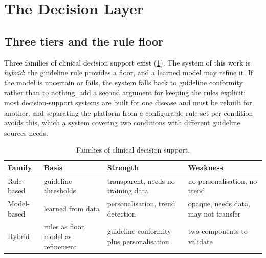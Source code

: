 \documentclass[11pt,a4paper,oneside]{report}
\begin{document}
\section{The Decision Layer}\label{sec:tiers}\label{sec:rule-floor}\label{sec:risk-score}

\subsection{Three tiers and the rule floor}

Three families of clinical decision support exist (\cref{tab:cdss-families}). The system of this work is \emph{hybrid}: the guideline rule provides a floor, and a learned model may refine it. If the model is uncertain or fails, the system falls back to guideline conformity rather than to nothing. \Textcite{yazdani2018} add a second argument for keeping the rules explicit: most decision-support systems are built for one disease and must be rebuilt for another, and separating the platform from a configurable rule set per condition avoids this, which a system covering two conditions with different guideline sources needs.

\begin{table}[htbp]
\centering\footnotesize
\caption{Families of clinical decision support.}\label{tab:cdss-families}
\begin{tabularx}{\textwidth}{@{}>{\raggedright\arraybackslash}p{2.0cm} >{\raggedright\arraybackslash}p{3.2cm} >{\raggedright\arraybackslash}X >{\raggedright\arraybackslash}X@{}}
\toprule
\textbf{Family} & \textbf{Basis} & \textbf{Strength} & \textbf{Weakness} \\
\midrule
Rule-based & guideline thresholds & transparent, needs no training data & no personalisation, no trend \\
Model-based & learned from data & personalisation, trend detection & opaque, needs data, may not transfer \\
Hybrid & rules as floor, model as refinement & guideline conformity plus personalisation & two components to validate \\
\bottomrule
\end{tabularx}
\end{table}
\end{document}
